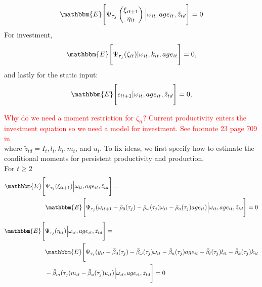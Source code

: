 \documentclass{article}
\begin{document}
\begin{equation}\label{qmoments}
\mathbbm{E}\Bigg[\Psi_{\tau_{j}}
\begin{pmatrix}
\xi_{it+1} \\
\eta_{it}
\end{pmatrix}
\Big|\omega_{it}, age_{it}, \tilde{z}_{td}\Bigg]=0
\end{equation}
For investment,
\begin{equation}\label{imoment}
\mathbbm{E}\Bigg[\Psi_{\tau_{j}}(\zeta_{it})|\omega_{it}, k_{it}, age_{it}\Bigg]=0,
\end{equation}
and lastly for the static input:
\begin{equation}\label{staticmoment}
\mathbbm{E}\Bigg[\epsilon_{it+1}|\omega_{it},age_{it}, \tilde{z}_{td}\Bigg]=0,
\end{equation}


\textcolor{red}{Why do we need a moment restriction for $\zeta_{it}$? Current productivity enters the investment equation so we need a model for investment. See footnote 23 page 709 in \cite{Arellano2017}}\\

where $\tilde{z}_{td}=I_{t}, l_{t}, k_{t}, m_{t}$, and $u_{t}$. To fix ideas, we first specify how to estimate the conditional moments for persistent productivity and production.\\

\noindent For $t\geq 2$
\begin{equation}\label{omegamoment}
\begin{split}
\mathbbm{E}\Bigg[&\Psi_{\tau_{j}}(\xi_{it+1})\Big|\omega_{it}, age_{it}, \tilde{z}_{td}\Bigg]=\\
&\mathbbm{E}\Bigg[\Psi_{\tau_{j}}(\omega_{it+1}-\bar{\rho}_{0}(\tau_{j})-\bar{\rho}_{\omega}(\tau_{j})\omega_{it}-\bar{\rho}_{a}(\tau_{j})age_{it})\Big|\omega_{it}, age_{it}, \tilde{z}_{td}\Bigg]=0
\end{split}
\end{equation}
\begin{equation}\label{ymoment}
\begin{split}
\mathbbm{E}\Bigg[&\Psi_{\tau_{j}}(\eta_{it})\Big|\omega_{it}, age_{it}, \tilde{z}_{td}\Bigg]=\\
&\mathbbm{E}\Bigg[\Psi_{\tau_{j}}(y_{it}-\bar{\beta}_{0}(\tau_{j})-\bar{\beta}_{\omega}(\tau_{j})\omega_{it}-\bar{\beta}_{a}(\tau_{j})age_{it}-\bar{\beta}_{l}(\tau_{j})l_{it}-\bar{\beta}_{k}(\tau_{j})k_{it}\\
&-\bar{\beta}_{m}(\tau_{j})m_{it}-\bar{\beta}_{u}(\tau_{j})u_{it})\Big|\omega_{it}, age_{it}, \tilde{z}_{td}\Bigg]=0
\end{split}
\end{equation}
\end{document}
